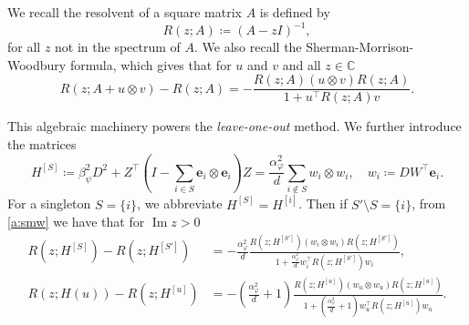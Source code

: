 \documentclass[letterpaper, 10pt, dvipsnames]{article}
\numberwithin{equation}{section}
\renewcommand{\Im}{\operatorname{Im}}
\newcommand{\C}{\mathbb{C}}
\renewcommand{\phi}{\varphi}
\theoremstyle{definition}
\begin{document}
We recall the resolvent of a square matrix $A$ is defined by 
\[
R(z;A) \coloneqq (A-zI)^{-1},
\]
for all $z$ not in the spectrum of $A$.
We also recall the Sherman-Morrison-Woodbury formula, which gives that for $u$ and $v$ and all $z \in \C$ 
\begin{equation}\label{a:smw}
R\left(z ; A+ u \otimes v \right)-R(z ; A)=-\frac{R(z ; A) (u \otimes v) R(z ; A)}{1+u^\top R(z ; A) v}.
\end{equation}

This algebraic machinery powers the \emph{leave-one-out} method.
We further introduce the matrices 
\[
H^{[S]} \coloneqq \beta_\psi^2 D^2 + 
Z^{\top} \left( I - \sum_{i \in S} \mathbf{e}_i \otimes \mathbf{e}_i \right) Z 
= \frac{\alpha_\phi^2}{d} \sum_{i \not\in S} w_i \otimes w_i,
\quad w_i \coloneqq  D W^{\top}\mathbf{e}_i.
\]
For a singleton $S = \{i\}$, we abbreviate $H^{[S]} = H^{[i]}$.
Then if $S' \setminus S = \{i\}$, from \eqref{a:smw} we have that for $\Im z > 0$
\begin{equation}\label{a:leaveoneout}
  \begin{aligned}
  R(z; H^{[S]}) - R(z; H^{[S']}) &= -\frac{\alpha_\phi^2}{d}\frac{R(z; H^{[S']}) (w_i \otimes w_i) R(z; H^{[S']})}{1+\frac{\alpha_\phi^2}{d}w_i^\top R(z; H^{[S']}) w_i}, \\
  R(z; H(u)) - R(z; H^{[u]}) &= -\left(\frac{\alpha_\phi^2}{d}+1\right)\frac{R(z; H^{[u]}) (w_u \otimes w_u) R(z; H^{[u]})}{1+\left(\frac{\alpha_\phi^2}{d}+1\right)w_u^\top R(z; H^{[u]}) w_u}.
  \end{aligned}
\end{equation}
\end{document}
